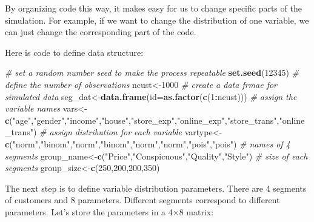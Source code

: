 \documentclass[12pt,]{krantz}
\makeatletter
\newenvironment{Shaded}{\begin{snugshade}}{\end{snugshade}}
\newcommand{\CommentTok}[1]{\textcolor[rgb]{0.37,0.37,0.37}{\textit{#1}}}
\newcommand{\DataTypeTok}[1]{\textcolor[rgb]{0.27,0.27,0.27}{#1}}
\newcommand{\DecValTok}[1]{\textcolor[rgb]{0.06,0.06,0.06}{#1}}
\newcommand{\KeywordTok}[1]{\textcolor[rgb]{0.27,0.27,0.27}{\textbf{#1}}}
\newcommand{\NormalTok}[1]{#1}
\newcommand{\OperatorTok}[1]{\textcolor[rgb]{0.43,0.43,0.43}{\textbf{#1}}}
\newcommand{\StringTok}[1]{\textcolor[rgb]{0.5,0.5,0.5}{#1}}
\newenvironment{kframe}{%
\medskip{}
\setlength{\fboxsep}{.8em}
 \def\at@end@of@kframe{}%
 \ifinner\ifhmode%
  \def\at@end@of@kframe{\end{minipage}}%
  \begin{minipage}{\columnwidth}%
 \fi\fi%
 \def\FrameCommand##1{\hskip\@totalleftmargin \hskip-\fboxsep
 \colorbox{shadecolor}{##1}\hskip-\fboxsep
     \hskip-\linewidth \hskip-\@totalleftmargin \hskip\columnwidth}%
 \MakeFramed {\advance\hsize-\width
   \@totalleftmargin\z@ \linewidth\hsize
   \@setminipage}}%
 {\par\unskip\endMakeFramed%
 \at@end@of@kframe}
\renewenvironment{Shaded}{\begin{kframe}}{\end{kframe}}
\makeatother
\begin{document}
By organizing code this way, it makes easy for us to change specific parts of the simulation. For example, if we want to change the distribution of one variable, we can just change the corresponding part of the code.

Here is code to define data structure:

\begin{Shaded}
\begin{Highlighting}[]
\CommentTok{# set a random number seed to make the process repeatable}
\KeywordTok{set.seed}\NormalTok{(}\DecValTok{12345}\NormalTok{)}
\CommentTok{# define the number of observations}
\NormalTok{ncust<-}\DecValTok{1000}
\CommentTok{# create a data frmae for simulated data}
\NormalTok{seg_dat<-}\KeywordTok{data.frame}\NormalTok{(}\DataTypeTok{id=}\KeywordTok{as.factor}\NormalTok{(}\KeywordTok{c}\NormalTok{(}\DecValTok{1}\OperatorTok{:}\NormalTok{ncust)))}
\CommentTok{# assign the variable names}
\NormalTok{vars<-}\KeywordTok{c}\NormalTok{(}\StringTok{"age"}\NormalTok{,}\StringTok{"gender"}\NormalTok{,}\StringTok{"income"}\NormalTok{,}\StringTok{"house"}\NormalTok{,}\StringTok{"store_exp"}\NormalTok{,}\StringTok{"online_exp"}\NormalTok{,}\StringTok{"store_trans"}\NormalTok{,}\StringTok{"online_trans"}\NormalTok{)}
\CommentTok{# assign distribution for each variable}
\NormalTok{vartype<-}\KeywordTok{c}\NormalTok{(}\StringTok{"norm"}\NormalTok{,}\StringTok{"binom"}\NormalTok{,}\StringTok{"norm"}\NormalTok{,}\StringTok{"binom"}\NormalTok{,}\StringTok{"norm"}\NormalTok{,}\StringTok{"norm"}\NormalTok{,}\StringTok{"pois"}\NormalTok{,}\StringTok{"pois"}\NormalTok{)}
\CommentTok{# names of 4 segments}
\NormalTok{group_name<-}\KeywordTok{c}\NormalTok{(}\StringTok{"Price"}\NormalTok{,}\StringTok{"Conspicuous"}\NormalTok{,}\StringTok{"Quality"}\NormalTok{,}\StringTok{"Style"}\NormalTok{)}
\CommentTok{# size of each segments}
\NormalTok{group_size<-}\KeywordTok{c}\NormalTok{(}\DecValTok{250}\NormalTok{,}\DecValTok{200}\NormalTok{,}\DecValTok{200}\NormalTok{,}\DecValTok{350}\NormalTok{)}
\end{Highlighting}
\end{Shaded}

The next step is to define variable distribution parameters. There are 4 segments of customers and 8 parameters. Different segments correspond to different parameters. Let's store the parameters in a 4×8 matrix:
\end{document}
